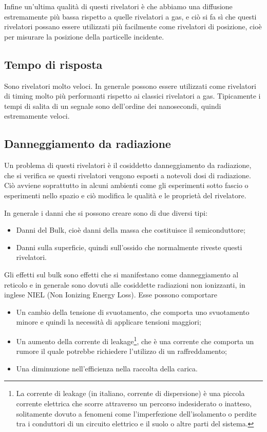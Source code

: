 Infine un'ultima qualità di questi rivelatori è che abbiamo una diffusione estremamente più bassa rispetto a quelle rivelatori a gas, e ciò si fa sì che questi rivelatori possano essere utilizzati più facilmente come rivelatori di posizione, cioè per misurare la posizione della particelle incidente.

\subsection{Tempo di risposta}

Sono rivelatori molto veloci. In generale possono essere utilizzati come rivelatori di timing molto più performanti rispetto ai classici rivelatori a gas. Tipicamente i tempi di salita di un segnale sono dell'ordine dei nanosecondi, quindi estremamente veloci.

\subsection{Danneggiamento da radiazione}
Un problema di questi rivelatori è il cosiddetto danneggiamento da radiazione, che si verifica se questi rivelatori vengono esposti a notevoli dosi di radiazione. Ciò avviene soprattutto in alcuni ambienti come gli esperimenti sotto fascio o esperimenti nello spazio e ciò modifica le qualità e le proprietà del rivelatore.

In generale i danni che si possono creare sono di due diversi tipi:
\begin{itemize}
   \item Danni del Bulk, cioè danni della massa che costituisce il semiconduttore;
   \item Danni sulla superficie, quindi sull'ossido che normalmente riveste questi rivelatori.
\end{itemize}

Gli effetti sul bulk sono effetti che si manifestano come danneggiamento al reticolo e in generale sono dovuti alle cosiddette radiazioni non ionizzanti, in inglese NIEL (Non Ionizing Energy Loss). Esse possono comportare
\begin{itemize}[leftmargin=0.5cm]
   \item Un cambio della tensione di svuotamento, che comporta uno svuotamento minore e quindi la necessità di applicare tensioni maggiori;
   \item Un aumento della corrente di leakage\footnote{La corrente di leakage (in italiano, corrente di dispersione) è una piccola corrente elettrica che scorre attraverso un percorso indesiderato o inatteso, solitamente dovuto a fenomeni come l'imperfezione dell'isolamento o perdite tra i conduttori di un circuito elettrico e il suolo o altre parti del sistema.}, che è una corrente che comporta un rumore il quale potrebbe richiedere l'utilizzo di un raffreddamento;
   \item Una diminuzione nell'efficienza nella raccolta della carica.
\end{itemize}

